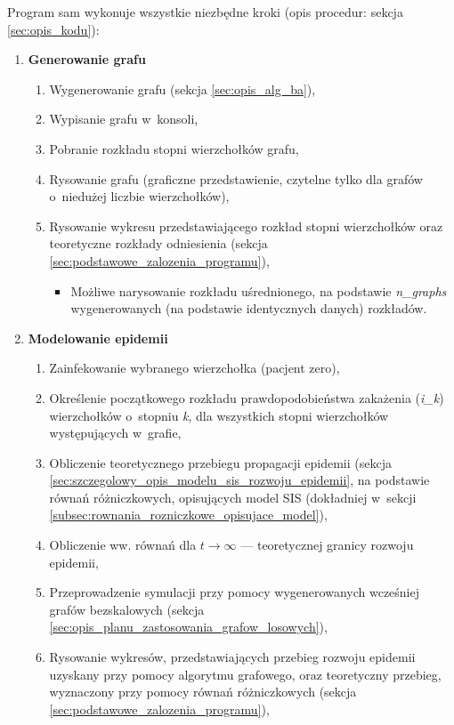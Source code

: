 \begin{enumerate}
Program sam wykonuje wszystkie niezbędne kroki (opis procedur: sekcja \ref{sec:opis_kodu}):
\begin{enumerate}[label=\bfseries{\Roman*})]
\item \textbf{Generowanie grafu} \hfill

  \begin{enumerate}[label=\arabic*)]
  \item Wygenerowanie grafu (sekcja \ref{sec:opis_alg_ba}),
  \item Wypisanie grafu w~konsoli,
  \item Pobranie rozkładu stopni wierzchołków grafu,
  \item Rysowanie grafu (graficzne przedstawienie, czytelne tylko dla grafów o~niedużej liczbie wierzchołków),
  \item Rysowanie wykresu przedstawiającego rozkład stopni wierzchołków oraz teoretyczne rozkłady odniesienia (sekcja \ref{sec:podstawowe_zalozenia_programu}),
    \begin{itemize}
    \item Możliwe narysowanie rozkładu uśrednionego, na podstawie \emph{n\_graphs} wygenerowanych (na podstawie identycznych danych) rozkładów.
    \end{itemize}
  \end{enumerate}  
\item \textbf{Modelowanie epidemii} \hfill
  \begin{enumerate}[label=\arabic*)]
  \item Zainfekowanie wybranego wierzchołka (pacjent zero),
  \item Określenie początkowego rozkładu prawdopodobieństwa zakażenia (\emph{i\_k}) wierzchołków o~stopniu \emph{k}, dla wszystkich stopni wierzchołków występujących w~grafie,
  \item Obliczenie teoretycznego przebiegu propagacji epidemii (sekcja \ref{sec:szczegolowy_opis_modelu_sis_rozwoju_epidemii}, na podstawie równań różniczkowych, opisujących model SIS (dokładniej w~sekcji \ref{subsec:rownania_rozniczkowe_opisujace_model}),
  \item Obliczenie ww. równań dla $t \rightarrow \infty$ --- teoretycznej granicy rozwoju epidemii,
  \item Przeprowadzenie symulacji przy pomocy wygenerowanych wcześniej grafów bezskalowych (sekcja \ref{sec:opis_planu_zastosowania_grafow_losowych}),
  \item Rysowanie wykresów, przedstawiających przebieg rozwoju epidemii uzyskany przy pomocy algorytmu grafowego, oraz teoretyczny przebieg, wyznaczony przy pomocy równań różniczkowych (sekcja \ref{sec:podstawowe_zalozenia_programu}),

\end{enumerate}
\end{enumerate}
\end{enumerate}
